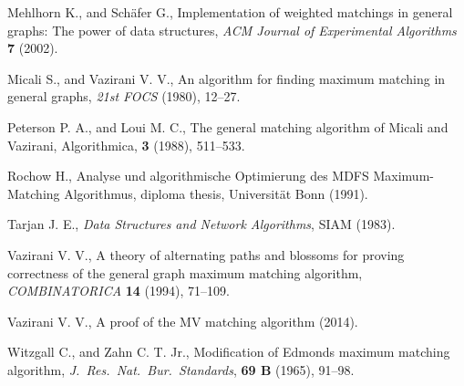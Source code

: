 \documentclass[12pt,twoside,a4paper]{article}
\begin{document}
\begin{thebibliography}{99}
 Mehlhorn K., and Sch\"{a}fer G., Implementation of  weighted
matchings in general graphs: The power of data structures, {\em ACM Journal of Experimental
Algorithms\/} {\bf 7} (2002).

 Micali S., and Vazirani V. V.,
An  algorithm for finding maximum matching in
general graphs, {\em 21st FOCS\/} (1980), 12--27.

 Peterson P. A., and Loui M. C., The general matching algorithm
of Micali and Vazirani, Algorithmica, {\bf 3} (1988), 511--533.

 Rochow H., Analyse und algorithmische Optimierung des MDFS
Maximum-Matching Algorithmus, diploma thesis, Universit\"at Bonn (1991).

 Tarjan J. E.,
{\em Data Structures and Network Algorithms}, SIAM (1983).

 Vazirani V. V.,
A theory of alternating paths and blossoms for proving correctness of
the  general graph maximum matching algorithm, 
{\em COMBINATORICA\/} {\bf 14} (1994), 71--109.

 Vazirani V. V., A proof of the MV matching algorithm (2014).

 Witzgall C., and Zahn C. T. Jr.,
Modification of Edmonds maximum matching algorithm,
{\em J.~Res.~Nat.~Bur.~Standards\/}, {\bf 69 B} (1965), 91--98.
\end{thebibliography}
\end{document}
